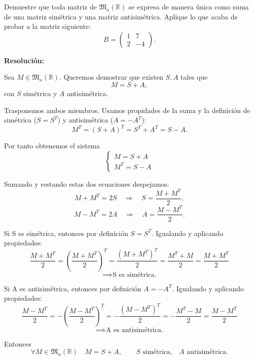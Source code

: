 \documentclass[a4paper,12pt]{article}
\begin{document}
\begin{ejercicio}[title=Ejercicio 6]
Demuestre que toda matriz de $\mathfrak{M}_n(\mathbb{R})$ se expresa de manera única como suma de una matriz simétrica y una matriz antisimétrica.  
Aplique lo que acaba de probar a la matriz siguiente:
\[
B =
\begin{pmatrix}
1 & 7\\
2 & -4
\end{pmatrix}.
\]

\tcblower
\textbf{Resolución:}

Sea \(M\in\mathfrak{M}_n(\mathbb{R})\). Queremos demostrar que existen \(S,A\) tales que
\[
M = S + A,
\]
con \(S\) simétrica y \(A\) antisimétrica.

Trasponemos ambos miembros. Usamos propidades de la suma y la definición de simétrica ($S=S^T$) y antisimétrica ($A=-A^T$):
\[
M^T = (S+A)^T = S^T + A^T = S - A.
\]

Por tanto obtenemos el sistema
\[
\begin{cases}
M = S + A\\[4pt]
M^T = S - A
\end{cases}
\]

Sumando y restando estas dos ecuaciones despejamos:
\[
M + M^T = 2S \quad\Longrightarrow\quad S = \frac{M+M^T}{2},
\]
\[
M - M^T = 2A \quad\Longrightarrow\quad A = \frac{M-M^T}{2}.
\]

Si S es simétrica, entonces por definición \(S = S^T\). Igualando y aplicando propiedades:
\[
\frac{M+M^T}{2}
= \left(\frac{M+M^T}{2}\right)^T
= \frac{(M+M^T)^T}{2}
= \frac{M^T+M}{2}
= \frac{M+M^T}{2}
\]
\[
\implies
\text{S es simétrica.}
\]

Si A es antisimétrica, entonces por definición \(A = -A^T\). Igualando y aplicando propiedades:
\[
\frac{M-M^T}{2}
= -\left(\frac{M-M^T}{2}\right)^T
= -\frac{(M-M^T)^T}{2}
= -\frac{M^T-M}{2}
= \frac{M-M^T}{2}
\]
\[
\implies
\text{A es antisimétrica.}
\]

Entonces
\[
\boxed{\forall M \in \mathfrak{M}_n(\mathbb{R})\quad M = S+A, \qquad S\text{ simétrica,} \quad A\text{ antisimétrica.}}
\]
\end{ejercicio}
\end{document}
